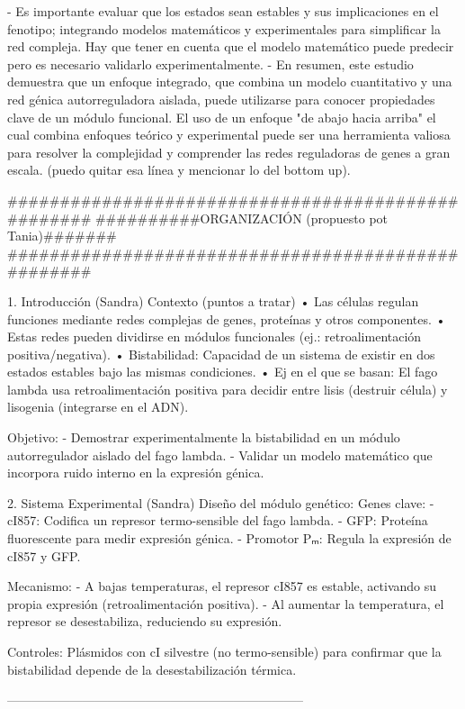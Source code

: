     - Es importante evaluar que los estados sean estables y sus implicaciones en el fenotipo; integrando modelos matemáticos y experimentales para simplificar la red compleja. Hay que tener en cuenta que el modelo matemático puede predecir pero es necesario validarlo experimentalmente.
    - En resumen, este estudio demuestra que un enfoque integrado, que combina un modelo cuantitativo y una red génica autorreguladora aislada, puede utilizarse para conocer propiedades clave de un módulo funcional. El uso de un enfoque "de abajo hacia arriba" el cual combina enfoques teórico y experimental puede ser una herramienta valiosa para resolver la complejidad y comprender las redes reguladoras de genes a gran escala.
	(puedo quitar esa línea y mencionar lo del bottom up).


###################################################
##########ORGANIZACIÓN (propuesto pot Tania)#######
###################################################

1. Introducción (Sandra)
Contexto (puntos a tratar)
•	Las células regulan funciones mediante redes complejas de genes, proteínas y otros componentes.
•	Estas redes pueden dividirse en módulos funcionales (ej.: retroalimentación positiva/negativa).
•	Bistabilidad: Capacidad de un sistema de existir en dos estados estables bajo las mismas condiciones.
•	Ej en el que se basan: El fago lambda usa retroalimentación positiva para decidir entre lisis (destruir célula) y lisogenia (integrarse en el ADN).

Objetivo:
- Demostrar experimentalmente la bistabilidad en un módulo autorregulador aislado del fago lambda.
- Validar un modelo matemático que incorpora ruido interno en la expresión génica.

2. Sistema Experimental (Sandra)
Diseño del módulo genético:
Genes clave:
- cI857: Codifica un represor termo-sensible del fago lambda.
- GFP: Proteína fluorescente para medir expresión génica.
- Promotor Pₘ: Regula la expresión de cI857 y GFP.

Mecanismo:
- A bajas temperaturas, el represor cI857 es estable, activando su propia expresión (retroalimentación positiva).
- Al aumentar la temperatura, el represor se desestabiliza, reduciendo su expresión.

Controles: Plásmidos con cI silvestre (no termo-sensible) para confirmar que la bistabilidad depende de la desestabilización térmica.

-----------------------------------------------------------------------

